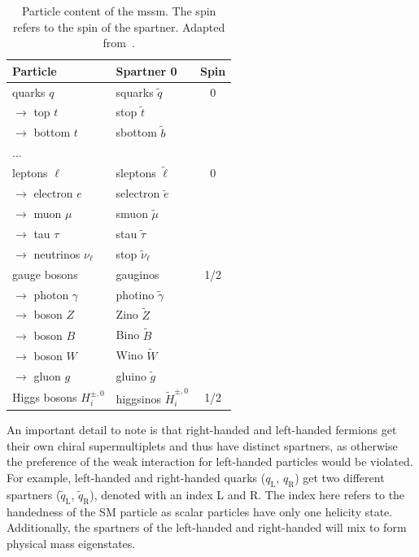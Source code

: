 \begin{table}
	\centering
	\small
	\setlength\heavyrulewidth{0.2ex}
	\caption{Particle content of the \gls{mssm}. The spin refers to the spin of the spartner. Adapted from~\cite{Bustamante:2009us}.}
	\begin{tabular} {l l c}
		
		\toprule
		Particle & Spartner 0 & Spin \\ 
		\midrule 
		quarks $q$ & squarks $\tilde{q}$ & 0 \\
		$\rightarrow$ top $t$ & stop $\tilde{t}$ & \\
		$\rightarrow$ bottom $t$ & sbottom $\tilde{b}$ & \\
		$\dots$ & & \\
		leptons $\ell$ & sleptons $\tilde{\ell}$ & 0 \\
		$\rightarrow$ electron $e$ & selectron $\tilde{e}$ & \\
		$\rightarrow$ muon $\mu$ & smuon $\tilde{\mu}$ & \\
		$\rightarrow$ tau $\tau$ & stau $\tilde{\tau}$ & \\
		$\rightarrow$ neutrinos $\nu_\ell$ & stop $\tilde{\nu}_\ell$ & \\
		\midrule
		gauge bosons & gauginos & 1/2 \\
		$\rightarrow$ photon $\gamma$ & photino $\tilde{\gamma}$ & \\
		$\rightarrow$ boson $Z$ & Zino $\tilde{Z}$ & \\
		$\rightarrow$ boson $B$ & Bino $\tilde{B}$ & \\
		$\rightarrow$ boson $W$ & Wino $\tilde{W}$ & \\
		$\rightarrow$ gluon $g$ & gluino $\tilde{g}$ & \\
		\midrule
		Higgs bosons $H^{\pm,0}_i$ & higgsinos $\tilde{H}^{\pm,0}_i$ & 1/2 \\
		\bottomrule
	\end{tabular}\vspace{3mm}
	\label{tab:particles_MSSM}   
\end{table}

An important detail to note is that right-handed and left-handed fermions get their own chiral supermultiplets and thus have distinct spartners, as otherwise the preference of the weak interaction for left-handed particles would be violated. 
For example, left-handed and right-handed quarks ($q_\mathrm{L}$, $q_\mathrm{R}$) get two different spartners ($\tilde{q}_\mathrm{L}$, $\tilde{q}_\mathrm{R}$), denoted with an index L and R. The index here refers to the handedness of the SM particle as scalar particles have only one helicity state. Additionally, the spartners of the left-handed and right-handed will mix to form physical mass eigenstates.

